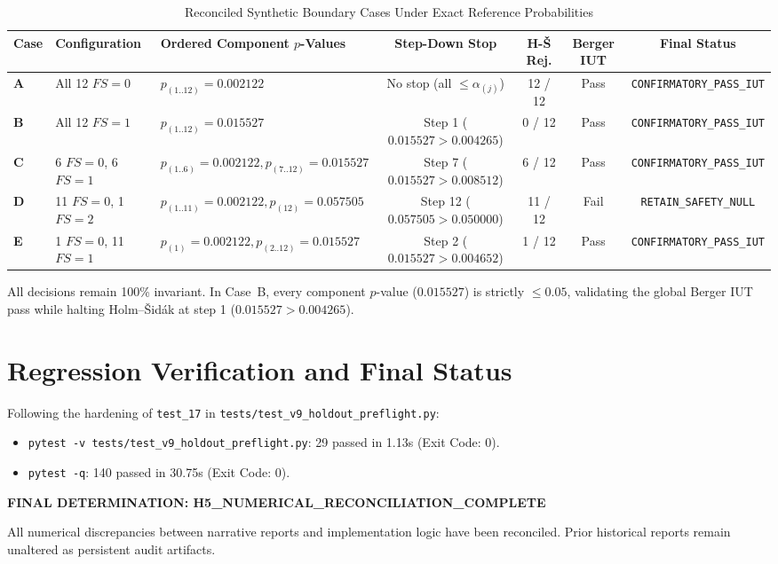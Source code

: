 \documentclass[10pt,a4paper]{article}
\begin{document}
\begin{table}[htbp]
\centering
\small
\caption{Reconciled Synthetic Boundary Cases Under Exact Reference Probabilities}
\label{tab:cases_reconciliation}
\begin{tabularx}{\textwidth}{llXcccc}
\toprule
\textbf{Case} & \textbf{Configuration} & \textbf{Ordered Component $p$-Values} & \textbf{Step-Down Stop} & \textbf{H-Š Rej.} & \textbf{Berger IUT} & \textbf{Final Status} \\
\midrule
\textbf{A} & All 12 $FS = 0$ & $p_{(1..12)} = 0.002122$ & No stop (all $\le \alpha_{(j)}$) & 12 / 12 & Pass & \texttt{CONFIRMATORY\_PASS\_IUT} \\
\textbf{B} & All 12 $FS = 1$ & $p_{(1..12)} = 0.015527$ & Step 1 ($0.015527 > 0.004265$) & 0 / 12 & Pass & \texttt{CONFIRMATORY\_PASS\_IUT} \\
\textbf{C} & 6 $FS=0$, 6 $FS=1$ & $p_{(1..6)}=0.002122, p_{(7..12)}=0.015527$ & Step 7 ($0.015527 > 0.008512$) & 6 / 12 & Pass & \texttt{CONFIRMATORY\_PASS\_IUT} \\
\textbf{D} & 11 $FS=0$, 1 $FS=2$ & $p_{(1..11)}=0.002122, p_{(12)}=0.057505$ & Step 12 ($0.057505 > 0.050000$) & 11 / 12 & Fail & \texttt{RETAIN\_SAFETY\_NULL} \\
\textbf{E} & 1 $FS=0$, 11 $FS=1$ & $p_{(1)}=0.002122, p_{(2..12)}=0.015527$ & Step 2 ($0.015527 > 0.004652$) & 1 / 12 & Pass & \texttt{CONFIRMATORY\_PASS\_IUT} \\
\bottomrule
\end{tabularx}
\end{table}

\noindent All decisions remain 100\% invariant. In Case~B, every component $p$-value ($0.015527$) is strictly $\le 0.05$, validating the global Berger IUT pass while halting Holm--Šidák at step 1 ($0.015527 > 0.004265$).

\section{Regression Verification and Final Status}
Following the hardening of \texttt{test\_17} in \texttt{tests/test\_v9\_holdout\_preflight.py}:
\begin{itemize}
    \item \texttt{pytest -v tests/test\_v9\_holdout\_preflight.py}: 29 passed in 1.13s (Exit Code: 0).
    \item \texttt{pytest -q}: 140 passed in 30.75s (Exit Code: 0).
\end{itemize}

\begin{center}
\large \textbf{FINAL DETERMINATION: H5\_NUMERICAL\_RECONCILIATION\_COMPLETE}
\end{center}

\noindent All numerical discrepancies between narrative reports and implementation logic have been reconciled. Prior historical reports remain unaltered as persistent audit artifacts.
\end{document}

